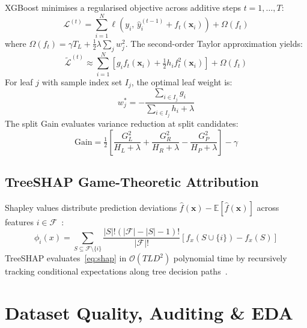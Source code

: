 \documentclass[conference]{IEEEtran}
\begin{document}
XGBoost minimises a regularised objective across additive steps
$t = 1,\dots,T$:
\begin{equation}
  \mathcal{L}^{(t)} =
    \sum_{i=1}^N \ell\!\left(y_i,\,\hat{y}_i^{(t-1)} + f_t(\mathbf{x}_i)\right)
    + \Omega(f_t)
\end{equation}
where $\Omega(f_t) = \gamma T_L + \tfrac{1}{2}\lambda\sum_j w_j^2$.
The second-order Taylor approximation yields:
\begin{equation}
  \tilde{\mathcal{L}}^{(t)} \approx
    \sum_{i=1}^N \!\left[g_i f_t(\mathbf{x}_i)
                         + \tfrac{1}{2}h_i f_t^2(\mathbf{x}_i)\right]
    + \Omega(f_t)
\end{equation}
For leaf $j$ with sample index set $I_j$, the optimal leaf weight is:
\begin{equation}
  w_j^* = -\frac{\sum_{i\in I_j}g_i}{\sum_{i\in I_j}h_i + \lambda}
\end{equation}
The split Gain evaluates variance reduction at split candidates:
\begin{equation}
  \text{Gain} = \tfrac{1}{2}\!\left[\frac{G_L^2}{H_L{+}\lambda}
                                    +\frac{G_R^2}{H_R{+}\lambda}
                                    -\frac{G_P^2}{H_P{+}\lambda}\right]-\gamma
\end{equation}

\subsection{TreeSHAP Game-Theoretic Attribution}

Shapley values distribute prediction deviations
$\hat{f}(\mathbf{x}) - \mathbb{E}[\hat{f}(\mathbf{x})]$ across
features $i\in\mathcal{F}$~\cite{lundberg2017unified}:
\begin{equation}
  \phi_i(x) =
    \sum_{S\subseteq\mathcal{F}\setminus\{i\}}
    \frac{|S|!(|\mathcal{F}|-|S|-1)!}{|\mathcal{F}|!}
    \left[f_x(S\cup\{i\}) - f_x(S)\right]
  \label{eq:shap}
\end{equation}
TreeSHAP evaluates~\eqref{eq:shap} in $\mathcal{O}(TLD^2)$ polynomial time by
recursively tracking conditional expectations along tree decision
paths~\cite{lundberg2020local}.

\section{Dataset Quality, Auditing \& EDA}
\label{sec:data}
\end{document}
